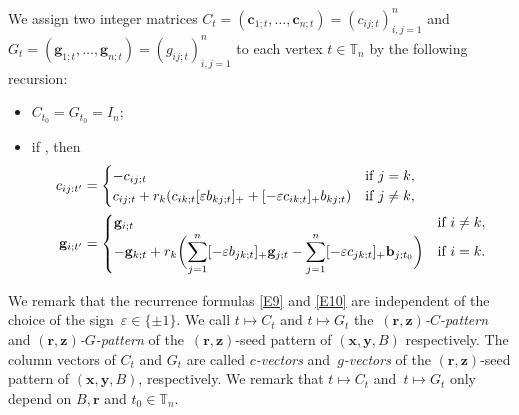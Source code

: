 We assign two integer matrices $C_t=(\mathbf{c}_{1;t},\dots,\mathbf{c}_{n;t} )=(c_{ij;t})_{i,j=1}^n$ and $G_t=(\mathbf{g}_{1;t},\dots, \mathbf{g}_{n;t})=(g_{ij;t})_{i,j=1}^n$ to each vertex $t\in \mathbb{T}_n$ by the following recursion:
\begin{itemize}\itemsep=0pt
 \item $C_{t_0}=G_{t_0}=I_n$;
 \item if , then
 \begin{align}
 c_{ij:t'}&=
 \begin{cases}
 -c_{ij;t} & \text{if $j=k$},\\
 c_{ij;t}+r_k(c_{ik;t}[\varepsilon b_{kj;t}]_++[-\varepsilon c_{ik;t}]_+b_{kj;t})& \text{if $ j\neq k$},
 \end{cases}\label{E9}\\
 \mathbf{g}_{i;t'}&=
 \begin{cases}
 \mathbf{g}_{i;t} & \text{if $i\neq k$},\\
 \displaystyle-\mathbf{g}_{k;t}+r_k\biggl(\sum\limits_{j=1}^{n}[-\varepsilon b_{jk;t}]_+\mathbf{g}_{j;t}-\sum\limits_{j=1}^{n}[-\varepsilon c_{jk;t}]_+\mathbf{b}_{j;t_0}\biggr) & \text{if $i=k$}.
 \end{cases}\label{E10}
 \end{align}
\end{itemize}
We remark that the recurrence formulas \eqref{E9} and \eqref{E10} are independent of the choice of the sign~${\varepsilon\in \{\pm 1\}}$.
We call $t\mapsto C_t$ and $t\mapsto G_t$ the~{\it $(\mathbf{r},\mathbf{z})$-$C$-pattern} and {\it $(\mathbf{r},\mathbf{z})$-$G$-pattern} of the~$(\mathbf{r},\mathbf{z})$-seed pattern of $(\mathbf{x},\mathbf{y}, B)$ respectively.
The column vectors of $C_t$ and $G_t$ are called {\it $c$-vectors} and~{\it $g$-vectors} of the $(\mathbf{r},\mathbf{z})$-seed pattern of $(\mathbf{x},\mathbf{y}, B)$, respectively. We remark that $t\mapsto C_t$ and~${t\mapsto G_t}$ only depend on $B, \mathbf{r}$ and $t_0\in \mathbb{T}_n$.

